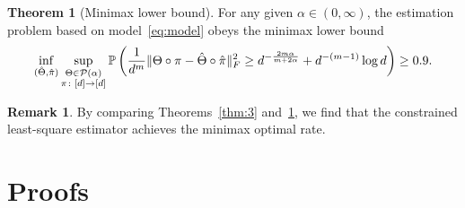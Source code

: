 \documentclass[11pt]{article}
\theoremstyle{definition}
\newtheorem{thm}{Theorem}
\newtheorem{rmk}{Remark}
\begin{document}
\begin{thm}[Minimax lower bound]\label{thm:minimax}For any given $\alpha\in(0,\infty)$, the estimation problem based on model~\eqref{eq:model} obeys the minimax lower bound 
\[
\inf_{(\hat \Theta,\hat \pi)}\sup_{\substack{\Theta\in \mathcal{P}(\alpha)\\ \pi\colon[d]\to[d]}} \mathbb{P}\left({1\over d^m}\lVert\Theta\circ \pi-\hat \Theta\circ \hat \pi\rVert_F^2 \geq d^{-{2m\alpha\over m+2\alpha}}+d^{-(m-1)}\log d \right) \geq 0.9.
\]
\end{thm}
\begin{rmk} By comparing Theorems~\ref{thm:3} and~\ref{thm:minimax}, we find that the constrained least-square estimator achieves the minimax optimal rate. 
\end{rmk}

\section{Proofs}
\end{document}
